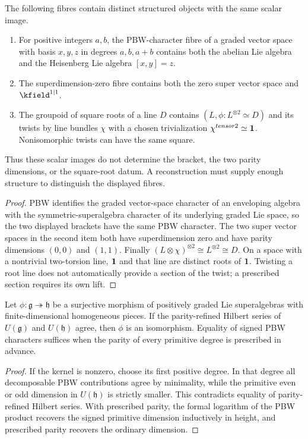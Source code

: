 \begin{theorem}
The following fibres contain distinct structured objects with the same scalar image.
\begin{enumerate}
\item For positive integers $a,b$, the PBW-character fibre of a graded vector
space with basis $x,y,z$ in degrees $a,b,a+b$ contains both the abelian Lie
algebra and the Heisenberg Lie algebra $[x,y]=z$.
\item The superdimension-zero fibre contains both the zero super vector space and $\kfield^{1|1}$.
\item The groupoid of square roots of a line $D$ contains $(L,\phi:L^{\otimes2}\simeq D)$ and its twists by line bundles $\chi$ with a chosen trivialization $\chi^{\otimes2}\simeq\mathbbm1$. Nonisomorphic twists can have the same square.
\end{enumerate}
Thus these scalar images do not determine the bracket, the two parity dimensions, or the square-root datum. A reconstruction must supply enough structure to distinguish the displayed fibres.
\end{theorem}
\begin{proof}
PBW identifies the graded vector-space character of an enveloping algebra with the symmetric-superalgebra character of its underlying graded Lie space, so the two displayed brackets have the same PBW character.  The two super vector spaces in the second item both have superdimension zero and have parity dimensions $(0,0)$ and $(1,1)$.  Finally $(L\otimes\chi)^{\otimes2}\cong L^{\otimes2}\cong D$. On a space with a nontrivial two-torsion line, $\mathbbm1$ and that line are distinct roots of $\mathbbm1$. Twisting a root line does not automatically provide a section of the twist; a prescribed section requires its own lift.
\end{proof}

\begin{recognition}
Let $\phi:\mathfrak g\twoheadrightarrow\mathfrak h$ be a surjective morphism of positively graded Lie superalgebras with finite-dimensional homogeneous pieces.  If the parity-refined Hilbert series of $U(\mathfrak g)$ and $U(\mathfrak h)$ agree, then $\phi$ is an isomorphism.  Equality of signed PBW characters suffices when the parity of every primitive degree is prescribed in advance.
\end{recognition}
\begin{proof}
If the kernel is nonzero, choose its first positive degree.  In that degree all decomposable PBW contributions agree by minimality, while the primitive even or odd dimension in $U(\mathfrak h)$ is strictly smaller.  This contradicts equality of parity-refined Hilbert series.  With prescribed parity, the formal logarithm of the PBW product recovers the signed primitive dimension inductively in height, and prescribed parity recovers the ordinary dimension.
\end{proof}

